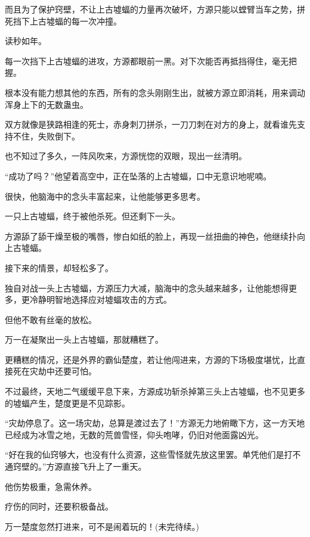 \begin{this_body}
而且为了保护窍壁，不让上古墟蝠的力量再次破坏，方源只能以螳臂当车之势，拼死挡下上古墟蝠的每一次冲撞。

读秒如年。

每一次挡下上古墟蝠的进攻，方源都眼前一黑。对下次能否再抵挡得住，毫无把握。

根本没有能力想其他的东西，所有的念头刚刚生出，就被方源立即消耗，用来调动浑身上下的无数蛊虫。

双方就像是狭路相逢的死士，赤身刺刀拼杀，一刀刀刺在对方的身上，就看谁先支持不住，失败倒下。

也不知过了多久，一阵风吹来，方源恍惚的双眼，现出一丝清明。

“成功了吗？”他望着高空中，正在坠落的上古墟蝠，口中无意识地呢喃。

很快，他脑海中的念头丰富起来，让他能够更多思考。

一只上古墟蝠，终于被他杀死。但还剩下一头。

方源舔了舔干燥至极的嘴唇，惨白如纸的脸上，再现一丝扭曲的神色，他继续扑向上古墟蝠。

接下来的情景，却轻松多了。

独自对战一头上古墟蝠，方源压力大减，脑海中的念头越来越多，让他能想得更多，更冷静明智地选择应对墟蝠攻击的方式。

但他不敢有丝毫的放松。

万一在凝聚出一头上古墟蝠，那就糟糕了。

更糟糕的情况，还是外界的霸仙楚度，若让他闯进来，方源的下场极度堪忧，比直接死在灾劫中还要可怕。

不过最终，天地二气缓缓平息下来，方源成功斩杀掉第三头上古墟蝠，也不见更多的墟蝠产生，楚度更是不见踪影。

“灾劫停息了。这一场灾劫，总算是渡过去了！”方源无力地俯瞰下方，这一方天地已经成为冰雪之地，无数的荒兽雪怪，仰头咆哮，仍旧对他面露凶光。

“好在我的仙窍够大，也没有什么资源，这些雪怪就先放这里罢。单凭他们是打不通窍壁的。”方源直接飞升上了一重天。

他伤势极重，急需休养。

疗伤的同时，还要积极备战。

万一楚度忽然打进来，可不是闹着玩的！(未完待续。)

\end{this_body}

